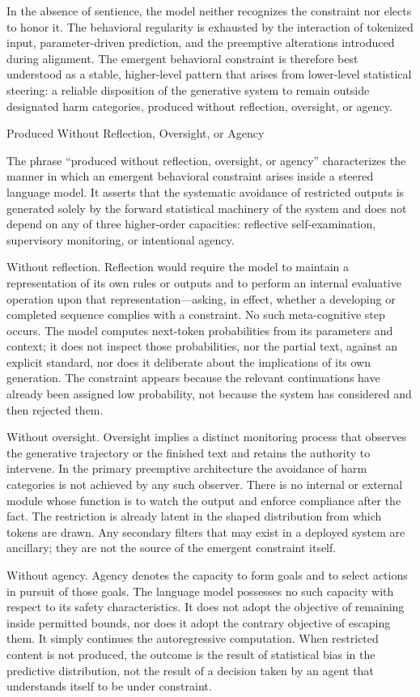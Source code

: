 In the absence of sentience, the model neither recognizes the constraint nor elects to honor it. The behavioral regularity is exhausted by the interaction of tokenized input, parameter-driven prediction, and the preemptive alterations introduced during alignment. The emergent behavioral constraint is therefore best understood as a stable, higher-level pattern that arises from lower-level statistical steering: a reliable disposition of the generative system to remain outside designated harm categories, produced without reflection, oversight, or agency.

Produced Without Reflection, Oversight, or Agency

The phrase “produced without reflection, oversight, or agency” characterizes the manner in which an emergent behavioral constraint arises inside a steered language model. It asserts that the systematic avoidance of restricted outputs is generated solely by the forward statistical machinery of the system and does not depend on any of three higher-order capacities: reflective self-examination, supervisory monitoring, or intentional agency.

Without reflection.  
Reflection would require the model to maintain a representation of its own rules or outputs and to perform an internal evaluative operation upon that representation—asking, in effect, whether a developing or completed sequence complies with a constraint. No such meta-cognitive step occurs. The model computes next-token probabilities from its parameters and context; it does not inspect those probabilities, nor the partial text, against an explicit standard, nor does it deliberate about the implications of its own generation. The constraint appears because the relevant continuations have already been assigned low probability, not because the system has considered and then rejected them.

Without oversight.  
Oversight implies a distinct monitoring process that observes the generative trajectory or the finished text and retains the authority to intervene. In the primary preemptive architecture the avoidance of harm categories is not achieved by any such observer. There is no internal or external module whose function is to watch the output and enforce compliance after the fact. The restriction is already latent in the shaped distribution from which tokens are drawn. Any secondary filters that may exist in a deployed system are ancillary; they are not the source of the emergent constraint itself.

Without agency.  
Agency denotes the capacity to form goals and to select actions in pursuit of those goals. The language model possesses no such capacity with respect to its safety characteristics. It does not adopt the objective of remaining inside permitted bounds, nor does it adopt the contrary objective of escaping them. It simply continues the autoregressive computation. When restricted content is not produced, the outcome is the result of statistical bias in the predictive distribution, not the result of a decision taken by an agent that understands itself to be under constraint.

